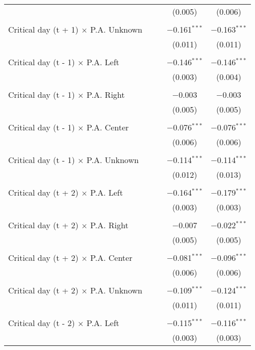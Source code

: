 \documentclass[
]{article}
\begin{document}
\begin{table}[!htbp]
{\begin{tabular}{@{\extracolsep{5pt}}lcccc}
  &  &  & (0.005) & (0.006) \\ 
  & & & & \\ 
 Critical day (t + 1) $\times$ P.A. Unknown &  &  & $-$0.161$^{***}$ & $-$0.163$^{***}$ \\ 
  &  &  & (0.011) & (0.011) \\ 
  & & & & \\ 
 Critical day (t - 1) $\times$ P.A. Left &  &  & $-$0.146$^{***}$ & $-$0.146$^{***}$ \\ 
  &  &  & (0.003) & (0.004) \\ 
  & & & & \\ 
 Critical day (t - 1) $\times$ P.A. Right &  &  & $-$0.003 & $-$0.003 \\ 
  &  &  & (0.005) & (0.005) \\ 
  & & & & \\ 
 Critical day (t - 1) $\times$ P.A. Center &  &  & $-$0.076$^{***}$ & $-$0.076$^{***}$ \\ 
  &  &  & (0.006) & (0.006) \\ 
  & & & & \\ 
 Critical day (t - 1) $\times$ P.A. Unknown &  &  & $-$0.114$^{***}$ & $-$0.114$^{***}$ \\ 
  &  &  & (0.012) & (0.013) \\ 
  & & & & \\ 
 Critical day (t + 2) $\times$ P.A. Left &  &  & $-$0.164$^{***}$ & $-$0.179$^{***}$ \\ 
  &  &  & (0.003) & (0.003) \\ 
  & & & & \\ 
 Critical day (t + 2) $\times$ P.A. Right &  &  & $-$0.007 & $-$0.022$^{***}$ \\ 
  &  &  & (0.005) & (0.005) \\ 
  & & & & \\ 
 Critical day (t + 2) $\times$ P.A. Center &  &  & $-$0.081$^{***}$ & $-$0.096$^{***}$ \\ 
  &  &  & (0.006) & (0.006) \\ 
  & & & & \\ 
 Critical day (t + 2) $\times$ P.A. Unknown &  &  & $-$0.109$^{***}$ & $-$0.124$^{***}$ \\ 
  &  &  & (0.011) & (0.011) \\ 
  & & & & \\ 
 Critical day (t - 2) $\times$ P.A. Left &  &  & $-$0.115$^{***}$ & $-$0.116$^{***}$ \\ 
  &  &  & (0.003) & (0.003) \\ 

\end{tabular}}
\end{table}
\end{document}
